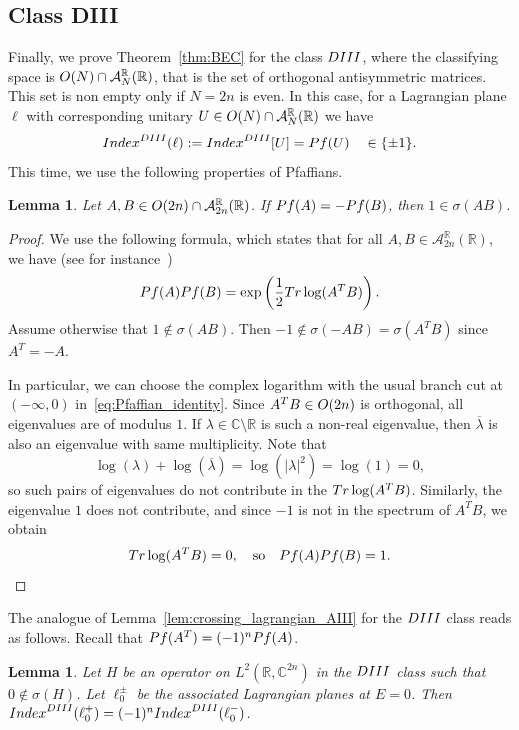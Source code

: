 \documentclass[11pt]{amsart}
\numberwithin{equation}{section} %
\newtheorem{lemma}[theorem]{Lemma}
\newcommand\1{{\mathds 1}}
\def\C{{\mathbb C}}
\def\R{{\mathbb R}}
\def\cA{{\mathcal A}}
\def\rDIII{{\rm DIII}}
\def\O{{\rm O}}
\def\Index{{\rm Index}}
\def\Tr{{\rm Tr}}
\def\Pf{{\rm Pf}}
\begin{document}
\subsection{Class DIII} Finally, we prove Theorem~\ref{thm:BEC} for the class $\rDIII$, where the classifying space is $\O(N) \cap \cA_N^{\R}(\R)$, that is the set of orthogonal antisymmetric matrices. This set is non empty only if $N = 2n$ is even. In this case, for a Lagrangian plane $\ell$ with corresponding unitary $U \in \O(N) \cap \cA_N^{\R}(\R)$ we have
\[
    \Index^\rDIII(\ell) := \Index^\rDIII[U]= \Pf (U) \quad \in \{ \pm 1\}.
\]
This time, we use the following properties of Pfaffians. 

\begin{lemma} \label{lem:Pfaffian_identity}
    Let $A, B \in \O(2n) \cap \cA_{2n}^\R(\R)$. If $\Pf(A) = - \Pf(B)$, then $1 \in \sigma(AB)$.
\end{lemma}

\begin{proof}
    We use the following formula, which states that for all $A, B \in \cA_{2n}^{\R}(\R)$, we have (see for instance~\cite{Kri-16})
    \begin{equation} \label{eq:Pfaffian_identity}
        \Pf(A) \Pf(B) = \exp \left( \frac12 \Tr \log (A^T B ) \right).
    \end{equation}
    Assume otherwise that $1 \notin \sigma(AB)$. Then $-1 \notin \sigma(-A B) = \sigma(A^T B)$ since $A^T = -A$. 
    
    In particular, we can choose the complex logarithm with the usual branch cut at $(-\infty, 0)$ in~\eqref{eq:Pfaffian_identity}. Since $A^T B \in \O(2n)$ is orthogonal, all eigenvalues are of modulus $1$. If $\lambda \in \C \setminus \R$ is such a non-real eigenvalue, then $\overline{\lambda}$ is also an eigenvalue with same multiplicity. Note that
    \[
        \log(\lambda) + \log(\overline{\lambda}) = \log(| \lambda |^2) = \log(1) = 0,
    \]
    so such pairs of eigenvalues do not contribute in the $\Tr \log(A^T B)$. Similarly, the eigenvalue $1$ does not contribute, and since $-1$ is not in the spectrum of $A^T B$, we obtain
    \[
        \Tr \log(A^T B) = 0, \quad \text{so} \quad \Pf(A) \Pf(B) = 1.
    \]
\end{proof}


The analogue of Lemma~\ref{lem:crossing_lagrangian_AIII} for the $\rDIII$ class reads as follows. Recall that $\Pf(A^T) = (-1)^n \Pf(A)$.
\begin{lemma}
    Let $H$ be an operator on $L^2(\mathbb R,\C^{2n})$ in the $\rDIII$ class such that  $0 \notin \sigma (H)$. Let $\ell_0^\pm$ be the associated Lagrangian planes at $E=0$. 
    Then $\Index^\rDIII(\ell_0^+) = (-1)^n \Index^\rDIII(\ell_0^-)$.
\end{lemma}
\end{document}
